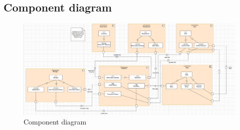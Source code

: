 \newpage
\subsection{Component diagram}

\begin{figure}[!h]
    \begin{center}
        \includegraphics[scale=0.3]{Images/component.png}
    \end{center}
    \hspace{0.3cm}
    \caption{Component diagram}
\end{figure}